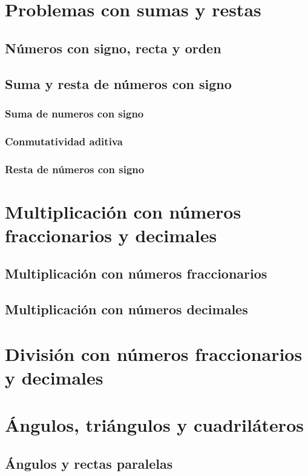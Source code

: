 \documentclass[11pt]{book}
\begin{document}
\newpage \thispagestyle{plain}
\section{Problemas con sumas y restas}
\subsection{N\'umeros con signo, recta y orden}
\subsection{Suma y resta de n\'umeros con signo}
\subsubsection{Suma de numeros con signo}
\subsubsection{Conmutatividad aditiva}
\subsubsection{Resta de n\'umeros con signo}
\newpage \thispagestyle{plain}
\section{Multiplicaci\'on con n\'umeros fraccionarios y decimales}
\subsection{Multiplicaci\'on con n\'umeros fraccionarios}
\subsection{Multiplicaci\'on con n\'umeros decimales}
\newpage \thispagestyle{plain}
\section{Divisi\'on con n\'umeros fraccionarios y decimales}
\newpage \thispagestyle{plain}
\section{\'Angulos, tri\'angulos y cuadril\'ateros}
\subsection{\'Angulos y rectas paralelas}
\end{document}
